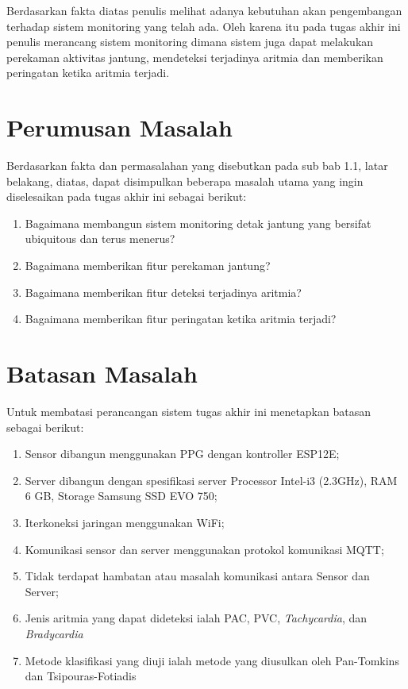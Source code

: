 Berdasarkan fakta diatas penulis melihat adanya kebutuhan akan pengembangan terhadap sistem monitoring yang telah ada. Oleh karena itu pada tugas akhir ini penulis merancang sistem monitoring dimana sistem juga dapat melakukan perekaman aktivitas jantung, mendeteksi terjadinya aritmia dan memberikan peringatan ketika aritmia terjadi.

\section{Perumusan Masalah}
Berdasarkan fakta dan permasalahan yang disebutkan pada sub bab 1.1, latar belakang, diatas, dapat disimpulkan beberapa masalah utama yang ingin diselesaikan pada tugas akhir ini sebagai berikut:
\begin{enumerate}
	\item Bagaimana membangun sistem monitoring detak jantung yang bersifat ubiquitous dan terus menerus?
	\item Bagaimana memberikan fitur perekaman jantung?
	\item Bagaimana memberikan fitur deteksi terjadinya aritmia?
	\item Bagaimana memberikan fitur peringatan ketika aritmia terjadi?
\end{enumerate}
\section{Batasan Masalah}
Untuk membatasi perancangan sistem tugas akhir ini menetapkan batasan sebagai berikut:
\begin{enumerate}
	\item Sensor dibangun menggunakan PPG dengan kontroller ESP12E;
    \item Server dibangun dengan spesifikasi server Processor Intel-i3 (2.3GHz), RAM 6 GB, Storage Samsung SSD EVO 750;
    \item Iterkoneksi jaringan menggunakan WiFi;
    \item Komunikasi sensor dan server menggunakan protokol
     komunikasi MQTT;
    \item Tidak terdapat hambatan atau masalah komunikasi antara Sensor dan Server;
    \item Jenis aritmia yang dapat dideteksi ialah PAC, PVC, \textit{Tachycardia}, dan \textit{Bradycardia}
    \item Metode klasifikasi yang diuji ialah metode yang diusulkan oleh Pan-Tomkins dan Tsipouras-Fotiadis
\end{enumerate}
